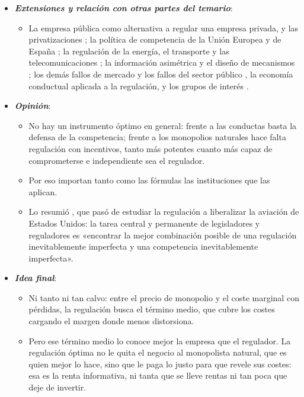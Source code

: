\documentclass[11pt]{article}
\begin{document}
\begin{itemize}
\begin{itemize}
  \end{itemize}
\item \textbf{\emph{Extensiones y relación con otras partes del temario}}:
  \begin{itemize}
  \item La empresa pública como alternativa a regular una empresa privada, y las privatizaciones ; la política de competencia de la Unión Europea y de España  ; la regulación de la energía, el transporte y las telecomunicaciones  ; la información asimétrica y el diseño de mecanismos  ; los demás fallos de mercado y los fallos del sector público , la economía conductual aplicada a la regulación\nocite{ThalerSunstein2003Libertarian}, y los grupos de interés .
  \end{itemize}
\item \textbf{\emph{Opinión}}:
  \begin{itemize}
  \item No hay un instrumento óptimo en general: frente a las conductas basta la defensa de la competencia; frente a los monopolios naturales hace falta regulación con incentivos, tanto más potentes cuanto más capaz de comprometerse e independiente sea el regulador.

  \item Por eso importan tanto como las fórmulas las instituciones que las aplican.

  \item Lo resumió , que pasó de estudiar la regulación a liberalizar la aviación de Estados Unidos: la tarea central y permanente de legisladores y reguladores es «encontrar la mejor combinación posible de una regulación inevitablemente imperfecta y una competencia inevitablemente imperfecta»\nocite{Kahn1988Economics}.
  \end{itemize}
\item \textbf{\emph{Idea final}}:
  \begin{itemize}
  \item Ni tanto ni tan calvo: entre el precio de monopolio y el coste marginal con pérdidas, la regulación busca el término medio, que cubre los costes cargando el margen donde menos distorsiona.

  \item Pero ese término medio lo conoce mejor la empresa que el regulador. La regulación óptima no le quita el negocio al monopolista natural, que es quien mejor lo hace, sino que le paga lo justo para que revele sus costes: esa es la renta informativa, ni tanta que se lleve rentas ni tan poca que deje de invertir.
  \end{itemize}
\end{itemize}
\end{document}
